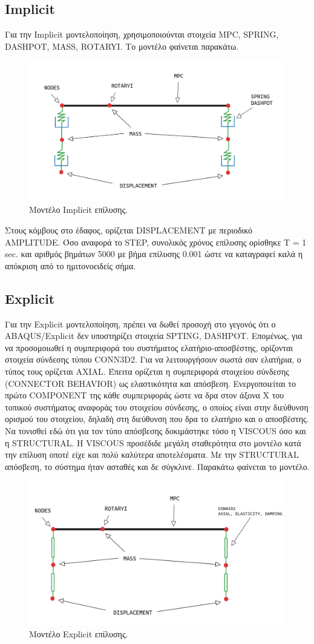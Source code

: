 \documentclass{article}
\begin{document}
\subsection{Implicit}
Για την Implicit μοντελοποίηση, χρησιμοποιούνται στοιχεία MPC, SPRING, DASHPOT, MASS, ROTARYI. Το μοντέλο φαίνεται παρακάτω.
\begin{figure}[H]
    \centering
    \includegraphics[width=0.6\linewidth]{media/imp.png}
    \caption{Μοντέλο Implicit επίλυσης.}
    \label{fig:imp}
\end{figure}

Στους κόμβους στο έδαφος, ορίζεται DISPLACEMENT με περιοδικό AMPLITUDE. Όσο αναφορά το STEP, συνολικός χρόνος επίλυσης ορίσθηκε Τ = 1 sec. και αριθμός βημάτων 5000 με βήμα επίλυσης 0.001 ώστε να καταγραφεί καλά η απόκριση από το ημιτονοειδείς σήμα.

\subsection{Explicit}
Για την Explicit μοντελοποίηση, πρέπει να δωθεί προσοχή στο γεγονός ότι ο ABAQUS/Explicit δεν υποστηρίζει στοιχεία SPTING, DASHPOT. Επομένως, για να προσομοιωθεί η συμπεριφορά του συστήματος ελατήριο-αποσβέστης, ορίζονται στοιχεία σύνδεσης τύπου CONN3D2. Για να λειτουργήσουν σωστά σαν ελατήρια, ο τύπος τους ορίζεται AXIAL. Έπειτα ορίζεται η συμπεριφορά στοιχείου σύνδεσης (CONNECTOR BEHAVIOR) ως ελαστικότητα και απόσβεση. Ενεργοποιείται το πρώτο COMPONENT της κάθε συμπεριφοράς ώστε να δρα στον άξονα X του τοπικού συστήματος αναφοράς του στοιχείου σύνδεσης, ο οποίος είναι στην διεύθυνση ορισμού του στοιχείου, δηλαδή στη διεύθυνση που δρα το ελατήριο και ο αποσβέστης. Να τονισθεί εδώ ότι για τον τύπο απόσβεσης δοκιμάστηκε τόσο η VISCOUS όσο και η STRUCTURAL. H VISCOUS προσέδιδε μεγάλη σταθερότητα στο μοντέλο κατά την επίλυση οποτέ είχε και πολύ καλύτερα αποτελέσματα. Με την STRUCTURAL απόσβεση, το σύστημα ήταν ασταθές και δε σύγκλινε. Παρακάτω φαίνεται το μοντέλο.
\begin{figure}[H]
    \centering
    \includegraphics[width=0.6\linewidth]{media/exp.png}
    \caption{Μοντέλο Explicit επίλυσης.}
    \label{fig:exp}
\end{figure}
\end{document}
